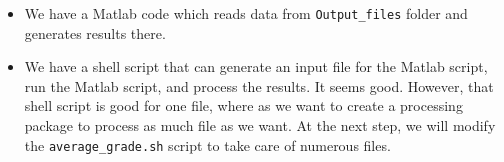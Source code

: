 \begin{itemize}
\item{We have a Matlab code which reads data from \texttt{Output\_files} folder and generates results there.}
\item{We have a shell script that can generate an input file for the Matlab script, run the Matlab script, and process the results. It seems good. However, that shell script is good for one file, where as we want to create a processing package to process as much file as we want. At the next step, we will modify the  \texttt{average\_grade.sh} script to take care of numerous files. }
\end{itemize}



